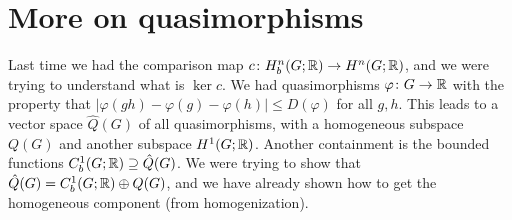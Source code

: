 \section{More on quasimorphisms} 
Last time we had the comparison map $c \colon H_b^n (G;\mathbb{R}) \to H^n (G;\mathbb{R})$, and we were trying to understand what is $\ker c$. We had quasimorphisms $\varphi  \colon G \to \mathbb{R}$ with the property that $|\varphi (gh)-\varphi (g)-\varphi (h)| \leq D(\varphi )$ for all $g,h$. This leads to a vector space $\hat{Q}(G)$ of all quasimorphisms, with a homogeneous subspace $Q(G)$ and another subspace $H^1(G;\mathbb{R})$. Another containment is the bounded functions $C^1 _b(G;\mathbb{R}) \supseteq \hat{Q}(G)$. We were trying to show that $\hat{Q}(G)= C^1_b(G;\mathbb{R}) \oplus Q(G)$, and we have already shown how to get the homogeneous component (from homogenization).

